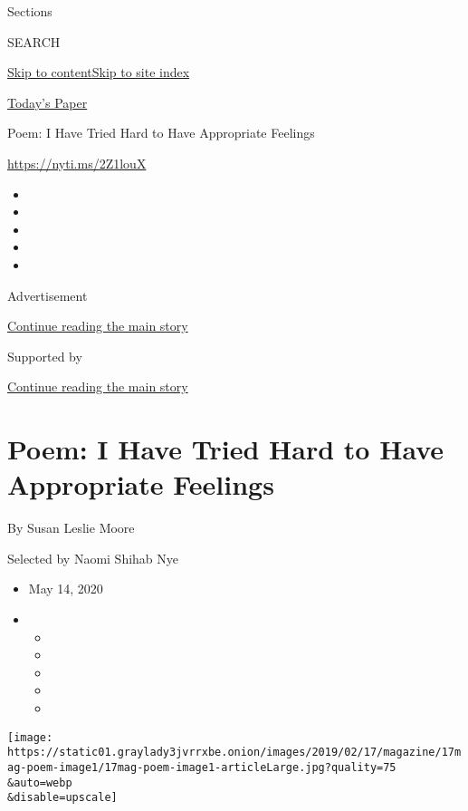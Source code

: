 Sections

SEARCH

\protect\hyperlink{site-content}{Skip to
content}\protect\hyperlink{site-index}{Skip to site index}

\href{https://myaccount.nytimes3xbfgragh.onion/auth/login?response_type=cookie\&client_id=vi}{}

\href{https://www.nytimes3xbfgragh.onion/section/todayspaper}{Today's
Paper}

Poem: I Have Tried Hard to Have Appropriate Feelings

\url{https://nyti.ms/2Z1louX}

\begin{itemize}
\item
\item
\item
\item
\item
\end{itemize}

Advertisement

\protect\hyperlink{after-top}{Continue reading the main story}

Supported by

\protect\hyperlink{after-sponsor}{Continue reading the main story}

\hypertarget{poem-i-have-tried-hard-to-have-appropriate-feelings}{%
\section{Poem: I Have Tried Hard to Have Appropriate
Feelings}\label{poem-i-have-tried-hard-to-have-appropriate-feelings}}

By Susan Leslie Moore

Selected by Naomi Shihab Nye

\begin{itemize}
\item
  May 14, 2020
\item
  \begin{itemize}
  \item
  \item
  \item
  \item
  \item
  \end{itemize}
\end{itemize}

\texttt{[image: https://static01.graylady3jvrrxbe.onion/images/2019/02/17/magazine/17mag-poem-image1/17mag-poem-image1-articleLarge.jpg?quality=75\\\&auto=webp\\\&disable=upscale]}


